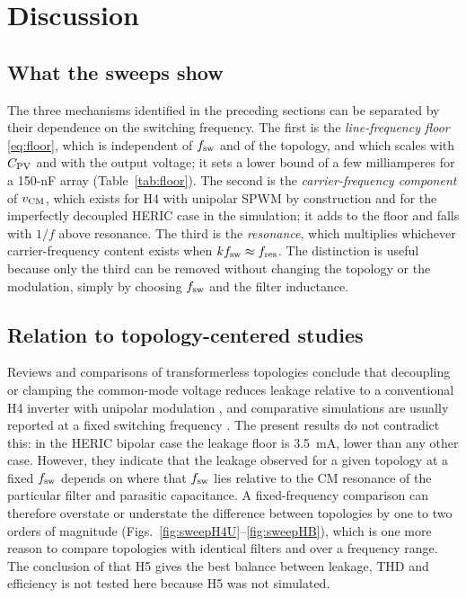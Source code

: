 \section{Discussion}
\label{sec:discussion}

\subsection{What the sweeps show}
The three mechanisms identified in the preceding sections can be separated by their dependence on the switching frequency. The first is the \emph{line-frequency floor} \eqref{eq:floor}, which is independent of $f_{\mathrm{sw}}$ and of the topology, and which scales with $C_{\mathrm{PV}}$ and with the output voltage; it sets a lower bound of a few milliamperes for a 150-nF array (Table~\ref{tab:floor}). The second is the \emph{carrier-frequency component} of $v_{\mathrm{CM}}$, which exists for H4 with unipolar SPWM by construction and for the imperfectly decoupled HERIC case in the simulation; it adds to the floor and falls with $1/f$ above resonance. The third is the \emph{resonance}, which multiplies whichever carrier-frequency content exists when $kf_{\mathrm{sw}}\approx f_{\mathrm{res}}$. The distinction is useful because only the third can be removed without changing the topology or the modulation, simply by choosing $f_{\mathrm{sw}}$ and the filter inductance.

\subsection{Relation to topology-centered studies}
Reviews and comparisons of transformerless topologies conclude that decoupling or clamping the common-mode voltage reduces leakage relative to a conventional H4 inverter with unipolar modulation \cite{Li2015,Khan2020,Kolodziejski2023}, and comparative simulations are usually reported at a fixed switching frequency \cite{Kibria2023,Shrestha2025}. The present results do not contradict this: in the HERIC bipolar case the leakage floor is 3.5~mA, lower than any other case. However, they indicate that the leakage observed for a given topology at a fixed $f_{\mathrm{sw}}$ depends on where that $f_{\mathrm{sw}}$ lies relative to the CM resonance of the particular filter and parasitic capacitance. A fixed-frequency comparison can therefore overstate or understate the difference between topologies by one to two orders of magnitude (Figs.~\ref{fig:sweepH4U}--\ref{fig:sweepHB}), which is one more reason to compare topologies with identical filters and over a frequency range. The conclusion of \cite{Shrestha2025} that H5 gives the best balance between leakage, THD and efficiency is not tested here because H5 was not simulated.

